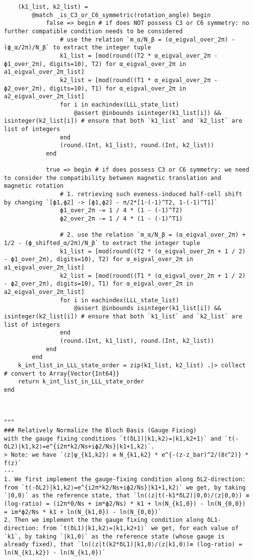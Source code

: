 \begin{verbatim}
    (k1_list, k2_list) =
        @match _is_C3_or_C6_symmetric(rotation_angle) begin
            false => begin # if does NOT possess C3 or C6 symmetry: no further compatible condition needs to be considered
                # use the relation `m_α/N_β = (α_eigval_over_2π) - (ϕ_α/2π)/N_β` to extract the integer tuple
                k1_list = [mod(round((T2 * α_eigval_over_2π - ϕ1_over_2π), digits=10), T2) for α_eigval_over_2π in a1_eigval_over_2π_list]
                k2_list = [mod(round((T1 * α_eigval_over_2π - ϕ2_over_2π), digits=10), T1) for α_eigval_over_2π in a2_eigval_over_2π_list]
                for i in eachindex(LLL_state_list)
                    @assert @inbounds isinteger(k1_list[i]) && isinteger(k2_list[i]) # ensure that both `k1_list` and `k2_list` are list of integers
                end
                (round.(Int, k1_list), round.(Int, k2_list))
            end

            true => begin # if does possess C3 or C6 symmetry: we need to consider the compatibility between magnetic translation and magnetic rotation
                # 1. retrieving such eveness-induced half-cell shift by changing `[ϕ1,ϕ2] -> [ϕ1,ϕ2] - π/2*[1-(-1)^T2, 1-(-1)^T1]` 
                ϕ1_over_2π -= 1 / 4 * (1 - (-1)^T2)
                ϕ2_over_2π -= 1 / 4 * (1 - (-1)^T1)

                # 2. use the relation `m_α/N_β = (α_eigval_over_2π) + 1/2 - (ϕ_shifted_α/2π)/N_β` to extract the integer tuple
                k1_list = [mod(round((T2 * (α_eigval_over_2π + 1 / 2) - ϕ1_over_2π), digits=10), T2) for α_eigval_over_2π in a1_eigval_over_2π_list]
                k2_list = [mod(round((T1 * (α_eigval_over_2π + 1 / 2) - ϕ2_over_2π), digits=10), T1) for α_eigval_over_2π in a2_eigval_over_2π_list]
                for i in eachindex(LLL_state_list)
                    @assert @inbounds isinteger(k1_list[i]) && isinteger(k2_list[i]) # ensure that both `k1_list` and `k2_list` are list of integers
                end
                (round.(Int, k1_list), round.(Int, k2_list))
            end
        end
    k_int_list_in_LLL_state_order = zip(k1_list, k2_list) .|> collect # convert to Array{Vector{Int64}}
    return k_int_list_in_LLL_state_order
end



"""
### Relatively Normalize the Bloch Basis (Gauge Fixing)
with the gauge fixing conditions `t(δL1)|k1,k2⟩=|k1,k2+1⟩` and `t(-δL2)|k1,k2⟩=e^{i2π*k2/Ns+iϕ2/Ns}|k1+1,k2⟩`. 
> Note: we have `⟨z|ψ_{k1,k2}⟩ ≡ N_{k1,k2} * e^{-(z-z_bar)^2/(8ℓ^2)} * f(z)`
---
1. We first implement the gauge-fixing condition along δL2-direction: from `t(-δL2)|k1,k2⟩=e^{i2π*k2/Ns+iϕ2/Ns}|k1+1,k2⟩` we get, by taking `|0,0⟩` as the reference state, that `ln(⟨z|t(-k1*δL2)|0,0⟩/⟨z|0,0⟩) ≡ (log-ratio) = (i2π*0/Ns + im*ϕ2/Ns) * k1 + ln(N_{k1,0}) - ln(N_{0,0}) = im*ϕ2/Ns * k1 + ln(N_{k1,0}) - ln(N_{0,0})`
2. Then we implement the the gauge fixing condition along δL1-direction: from `t(δL1)|k1,k2⟩=|k1,k2+1⟩` we get, for each value of `k1`, by taking `|k1,0⟩` as the reference state (whose gauge is already fixed), that `ln(⟨z|t(k2*δL1)|k1,0⟩/⟨z|k1,0⟩)≡ (log-ratio) = ln(N_{k1,k2}) - ln(N_{k1,0})`


\end{verbatim}
